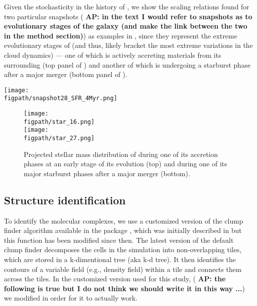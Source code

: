 \documentclass[apj]{emulateapj} %
\newcommand{\AP}[1]{({\bf \color{apcolor} AP: #1})}
\begin{document}
Given the stochasticity in the \SF history of \flower, 
we show the scaling relations found for two particular snapshots \AP{in the text I would refer to snapshots as to evolutionary stages of the galaxy (and make the link between the two in the method section)} as examples in ,
since they represent the extreme evolutionary stages of \flower (and thus, likely bracket the
most extreme variations in the cloud dynamics) --- one of which \flower is 
actively accreting materials from its surrounding (top panel of ) 
and another of which \flower is undergoing 
a starburst phase after a major merger (bottom panel of ). 

\begin{figure*}[htbp]
\centering
\texttt{[image: \\figpath/snapshot28\_SFR\_4Myr.png]}  
\caption{
	Star formation history of \flower \AP{if possible I would combine it with Fig. \ref{fig:phases} (as in the talk), or remove 
	Fig. \ref{fig:phases}, as at the moment it does not add much to the discussion.
	}.
\label{fig:SFH}}
\end{figure*}


\begin{figure}[htbp]
\centering
\texttt{[image: \\figpath/star\_16.png]}  
\\ [-5em]
\texttt{[image: \\figpath/star\_27.png]}  
\caption{
Projected stellar mass distribution of \flower during one of its accretion phases 
at an early stage of its evolution (top) and during one of its major starburst phases 
after a major merger (bottom).
\label{fig:phases}}
\end{figure}

\subsection{Structure identification} \label{sec:method}

To identify the molecular complexes, we use a customized version of the clump finder algorithm available in the  package  \citep{Turk2011a}, which was initially described in \citet{Smith09a} but this function has been modified since then.
%
The latest version of the default  clump finder decomposes the cells in the simulation into non-overlapping tiles, which are stored in a k-dimentional tree (aka k-d tree). It then identifies the contours of a variable field (e.g., density field) within a tile and connects them across the tiles. In the customized version used for this study, \AP{the following is true but I do not think we should write it in this way ...} we modified  in order for it to actually work.
\end{document}
